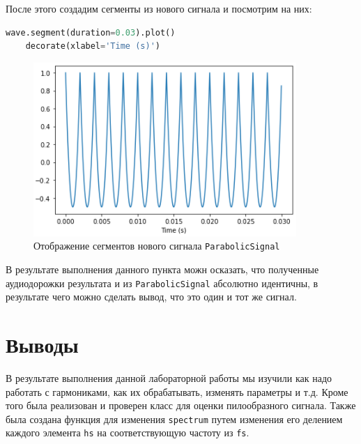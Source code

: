 \documentclass[a4paper]{article}
\begin{document}
            После этого создадим сегменты из нового сигнала и посмотрим на них:
            
\begin{lstlisting}[language=Python, caption= Отображение сегментов нового сигнала \texttt{ParabolicSignal}]
    wave.segment(duration=0.03).plot()
    decorate(xlabel='Time (s)')
\end{lstlisting}               
            
            \begin{figure}[H]
                \centering
                \includegraphics[width=\textwidth]{ex_6_parabolicSignal_segment.png}
                \caption{Отображение сегментов нового сигнала \texttt{ParabolicSignal}}
                \label{fig:ex_6_parabolicSignal_segment}
            \end{figure}
            
            В результате выполнения данного пункта можн осказать, что полученные аудиодорожки результата и из \texttt{ParabolicSignal} абсолютно идентичны, в результате чего можно сделать вывод, что это один и тот же сигнал.
            
    \newpage
        \section{Выводы}
            В результате выполнения данной лабораторной работы мы изучили как надо работать с гармониками, как их обрабатывать, изменять параметры и т.д. Кроме того была реализован и проверен класс для оценки пилообразного сигнала. Также была создана функция для изменения \texttt{spectrum} путем изменения его делением каждого элемента \texttt{hs} на соответствующую частоту из \texttt{fs}. 
\end{document}
